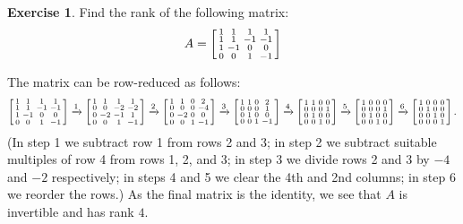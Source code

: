 \documentclass[a4paper]{amsart}
\theoremstyle{definition}
\newtheorem{exercise}{Exercise}
\newenvironment{solution}{{\noindent \bf Solution:}}{}
\begin{document}
\begin{exercise}\label{ex-rank}
 Find the rank of the following matrix:
 \[ A = \left[\begin{smallmatrix}  1 &  1 &  1 &  1 \\
              1 &  1 & -1 & -1 \\
              1 & -1 &  0 &  0 \\
              0 &  0 &  1 & -1 \end{smallmatrix}\right]
 \]
\end{exercise}
\begin{solution}
 The matrix can be row-reduced as follows:
 {\tiny \[
  \left[\begin{smallmatrix}  1 &  1 &  1 &  1 \\
        1 &  1 & -1 & -1 \\
        1 & -1 &  0 &  0 \\
        0 &  0 &  1 & -1 \end{smallmatrix}\right] \xrightarrow{1}
  \left[\begin{smallmatrix}  1 &  1 &  1 &  1 \\
        0 &  0 & -2 & -2 \\
        0 & -2 & -1 &  1 \\
        0 &  0 &  1 & -1 \end{smallmatrix}\right] \xrightarrow{2}
  \left[\begin{smallmatrix}  1 &  1 &  0 &  2 \\
        0 &  0 &  0 & -4 \\
        0 & -2 &  0 &  0 \\
        0 &  0 &  1 & -1 \end{smallmatrix}\right] \xrightarrow{3}
  \left[\begin{smallmatrix}  1 &  1 &  0 &  2 \\
        0 &  0 &  0 &  1 \\
        0 &  1 &  0 &  0 \\
        0 &  0 &  1 & -1 \end{smallmatrix}\right] \xrightarrow{4}
  \left[\begin{smallmatrix}  1 &  1 &  0 &  0 \\
        0 &  0 &  0 &  1 \\
        0 &  1 &  0 &  0 \\
        0 &  0 &  1 &  0 \end{smallmatrix}\right] \xrightarrow{5}
  \left[\begin{smallmatrix}  1 &  0 &  0 &  0 \\
        0 &  0 &  0 &  1 \\
        0 &  1 &  0 &  0 \\
        0 &  0 &  1 &  0 \end{smallmatrix}\right] \xrightarrow{6}
  \left[\begin{smallmatrix}  1 &  0 &  0 &  0 \\
        0 &  1 &  0 &  0 \\
        0 &  0 &  1 &  0 \\
        0 &  0 &  0 &  1 \end{smallmatrix}\right].
 \]}
 (In step 1 we subtract row 1 from rows 2 and 3; in step 2
 we subtract suitable multiples of row 4 from rows 1, 2, and
 3; in step 3 we divide rows 2 and 3 by $-4$ and $-2$
 respectively; in steps 4 and 5 we clear the 4th and 2nd
 columns; in step 6 we reorder the rows.)  As the final
 matrix is the identity, we see that $A$ is invertible and
 has rank $4$. 
\end{solution}

\closegraphsfile
\end{document}
